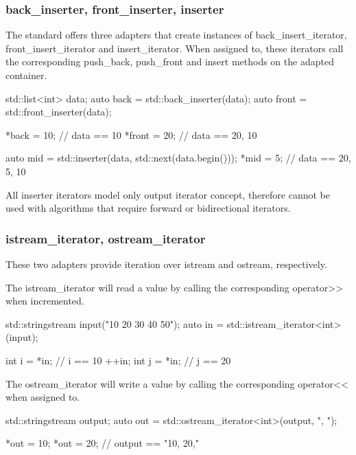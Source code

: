 \subsubsection{back\_inserter, front\_inserter, inserter}

The standard offers three adapters that create instances of back\_insert\_iterator, front\_insert\_iterator and insert\_iterator. When assigned to, these iterators call the corresponding push\_back, push\_front and insert methods on the adapted container.

\begin{box-note}
\begin{cppcode}
std::list<int> data;
auto back = std::back_inserter(data);
auto front = std::front_inserter(data);

*back = 10;
// data == { 10 }
*front = 20;
// data == { 20, 10 }

auto mid = std::inserter(data, std::next(data.begin()));
*mid = 5;
// data == { 20, 5, 10 }
\end{cppcode}
\end{box-note}

All inserter iterators model only output iterator concept, therefore cannot be used with algorithms that require forward or bidirectional iterators.

\subsubsection{istream\_iterator, ostream\_iterator}

These two adapters provide iteration over istream and ostream, respectively.

The istream\_iterator will read a value by calling the corresponding operator>> when incremented.

\begin{box-note}
\begin{cppcode}
std::stringstream input("10 20 30 40 50");
auto in = std::istream_iterator<int>(input);

int i = *in; // i == 10
++in;
int j = *in; // j == 20
\end{cppcode}
\end{box-note}

The ostream\_iterator will write a value by calling the corresponding operator<< when assigned to.

\begin{box-note}
\begin{cppcode}
std::stringstream output;
auto out = std::ostream_iterator<int>(output, ", ");

*out = 10;
*out = 20;
// output == "10, 20,"
\end{cppcode}
\end{box-note}

